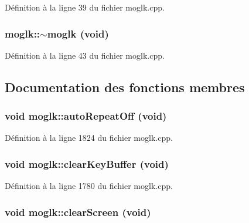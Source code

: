 Définition à la ligne 39 du fichier moglk.cpp.\hypertarget{classmoglk_19ba0cf0910a364b32685b1806a98773}{
\subsubsection[{$\sim$moglk}]{\setlength{\rightskip}{0pt plus 5cm}moglk::$\sim$moglk (void)}}
\label{classmoglk_19ba0cf0910a364b32685b1806a98773}




Définition à la ligne 43 du fichier moglk.cpp.

\subsection{Documentation des fonctions membres}
\hypertarget{classmoglk_cbeba932b129751d3980fccf9f462ef0}{
\subsubsection[{autoRepeatOff}]{\setlength{\rightskip}{0pt plus 5cm}void moglk::autoRepeatOff (void)}}
\label{classmoglk_cbeba932b129751d3980fccf9f462ef0}




Définition à la ligne 1824 du fichier moglk.cpp.\hypertarget{classmoglk_cf2b77285c9281037e194508041c1409}{
\subsubsection[{clearKeyBuffer}]{\setlength{\rightskip}{0pt plus 5cm}void moglk::clearKeyBuffer (void)}}
\label{classmoglk_cf2b77285c9281037e194508041c1409}




Définition à la ligne 1780 du fichier moglk.cpp.\hypertarget{classmoglk_40044034e8cb0e4caa5c240865ab5b35}{
\subsubsection[{clearScreen}]{\setlength{\rightskip}{0pt plus 5cm}void moglk::clearScreen (void)}}
\label{classmoglk_40044034e8cb0e4caa5c240865ab5b35}




